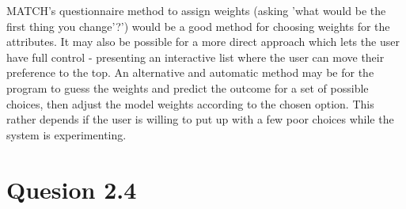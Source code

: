 \documentclass[a4paper,11pt,oneside]{article}
\begin{document}
MATCH's questionnaire method to assign weights (asking 'what would be the first thing you change'?') would be a good method for choosing weights for the attributes. It may also be possible for a more direct approach which lets the user have full control - presenting an interactive list where the user can move their preference to the top. An alternative and automatic method may be for the program to guess the weights and predict the outcome for a set of possible choices, then adjust the model weights according to the chosen option. This rather depends if the user is willing to put up with a few poor choices while the system is experimenting.

\section{Quesion 2.4}
\end{document}
